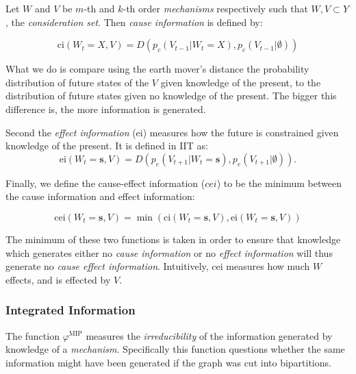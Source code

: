 Let $W$ and $V$ be $m$-th and $k$-th order \textit{mechanisms} respectively such that $W,V \subset Y$, the \textit{consideration set}. Then \textit{cause information} is defined \cite{oizumi2014phenomenology} by:

\begin{equation}
\label{def:ci}
\text{ci}(W_{t} = X, V) = D\left(p_c(V_{t-1}|W_{t} = X),p_c(V_{t-1}|\emptyset)\right)
\end{equation}

What we do is compare using the earth mover's distance the probability distribution of future states of the  $V $ given knowledge of the present, to the distribution of future states given no knowledge of the present. The bigger this difference is, the more information is generated. 

Second the \textit{effect information} (ei) measures how the future is constrained given knowledge of the present. It is defined in IIT \cite{oizumi2014phenomenology} as:
\begin{equation}
\label{def:ei}
\text{ei}(W_{t} = \mathbf{s}, V) = D\left(p_e(V_{t+1}|W_{t} = \mathbf{s}),p_{e}(V_{t+1}|\emptyset)\right).
\end{equation}

Finally, we define the cause-effect information ($cei$) to be the minimum between the cause information and effect information:

\begin{equation}
\label{def:cei}
\text{cei}(W_{t} = \mathbf{s}, V) = \min\left(\text{ci}(W_{t} = \mathbf{s}, V), \text{ei}(W_{t} = \mathbf{s}, V) \right)
\end{equation}

The minimum of these two functions is taken in order to ensure that knowledge which generates either no \textit{cause information} or no \textit{effect information} will thus generate no \textit{cause effect information}. Intuitively, cei measures how much $W$ effects, and is effected by $V$.

\subsubsection{Integrated Information}
\label{sec:mech_integration}
The function $\varphi^{\text{MIP}}$ measures the \textit{irreducibility} of the information generated by knowledge of a \textit{mechanism}. Specifically this function questions whether the same information might have been generated if the graph was cut into bipartitions. 

